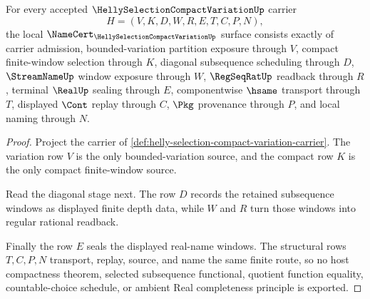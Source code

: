 \begin{theorem}
\label{thm:helly-selection-compact-variation-namecert-obligations}
For every accepted $\HellySelectionCompactVariationUp$ carrier
$$
H=(V,K,D,W,R,E,T,C,P,N),
$$
the local $\NameCert_{\HellySelectionCompactVariationUp}$ surface consists exactly of carrier admission, bounded-variation partition exposure through $V$, compact finite-window selection through $K$, diagonal subsequence scheduling through $D$, $\StreamNameUp$ window exposure through $W$, $\RegSeqRatUp$ readback through $R$, terminal $\RealUp$ sealing through $E$, componentwise $\hsame$ transport through $T$, displayed $\Cont$ replay through $C$, $\Pkg$ provenance through $P$, and local naming through $N$.
\end{theorem}
\begin{proof}
Project the carrier of \autoref{def:helly-selection-compact-variation-carrier}. The variation row $V$ is the only bounded-variation source, and the compact row $K$ is the only compact finite-window source.

Read the diagonal stage next. The row $D$ records the retained subsequence windows as displayed finite depth data, while $W$ and $R$ turn those windows into regular rational readback.

Finally the row $E$ seals the displayed real-name windows. The structural rows $T,C,P,N$ transport, replay, source, and name the same finite route, so no host compactness theorem, selected subsequence functional, quotient function equality, countable-choice schedule, or ambient Real completeness principle is exported.
\end{proof}

